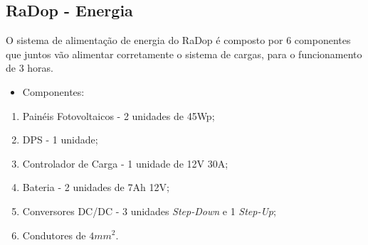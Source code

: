 \begin{enumerate}
            
            

     
%         
     

     
             
        \end{enumerate}
            
             \subsection{RaDop - Energia}
             
O sistema de alimentação de energia do RaDop é composto por 6 componentes que juntos vão alimentar corretamente o sistema de cargas, para o funcionamento de 3 horas.

             \begin{itemize}
                 \item Componentes:
             \end{itemize}
             \begin{enumerate}
                 
             \item Painéis Fotovoltaicos - 2 unidades de 45Wp;
             
             \item DPS - 1 unidade;
             \item Controlador de Carga - 1 unidade de 12V 30A;
             
             \item Bateria - 2 unidades de 7Ah 12V;
             
             \item Conversores DC/DC - 3 unidades \emph{Step-Down} e 1 \emph{Step-Up};
             
             \item Condutores de $4mm^2$.
             \end{enumerate}
             
